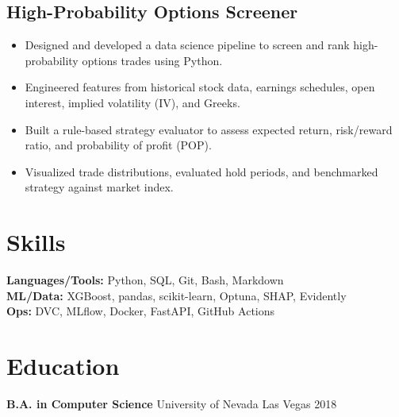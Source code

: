 \documentclass[a4paper,10pt]{article}
\begin{document}
\subsection*{High-Probability Options Screener}
\begin{itemize}[noitemsep]
    \item Designed and developed a data science pipeline to screen and rank high-probability options trades using Python.
    \item Engineered features from historical stock data, earnings schedules, open interest, implied volatility (IV), and Greeks.
    \item Built a rule-based strategy evaluator to assess expected return, risk/reward ratio, and probability of profit (POP).
    \item Visualized trade distributions, evaluated hold periods, and benchmarked strategy against market index.
\end{itemize}

\section*{Skills}

\textbf{Languages/Tools:} Python, SQL, Git, Bash, Markdown \\
\textbf{ML/Data:} XGBoost, pandas, scikit-learn, Optuna, SHAP, Evidently \\
\textbf{Ops:} DVC, MLflow, Docker, FastAPI, GitHub Actions

\section*{Education}

\textbf{B.A. in Computer Science} \hfill University of Nevada Las Vegas \hfill 2018
\end{document}
